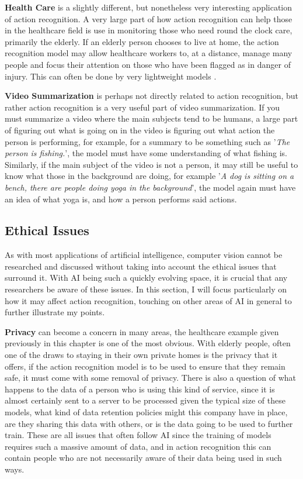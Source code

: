 \textbf{Health Care} is a slightly different, but nonetheless very interesting application of action recognition. A very large part of how action recognition can help those in the healthcare field is use in monitoring those who need round the clock care, primarily the elderly. If an elderly person chooses to live at home, the action recognition model may allow healthcare workers to, at a distance, manage many people and focus their attention on those who have been flagged as in danger of injury. This can often be done by very lightweight models \cite{Eldermonitoring}.

\textbf{Video Summarization} is perhaps not directly related to action recognition, but rather action recognition is a very useful part of video summarization. If you must summarize a video where the main subjects tend to be humans, a large part of figuring out what is going on in the video is figuring out what action the person is performing, for example, for a summary to be something such as '\textit{The person is fishing.}', the model must have some understanding of what fishing is. Similarly, if the main subject of the video is not a person, it may still be useful to know what those in the background are doing, for example '\textit{A dog is sitting on a bench, there are people doing yoga in the background}', the model again must have an idea of what yoga is, and how a person performs said actions.

\subsection{Ethical Issues}

As with most applications of artificial intelligence, computer vision cannot be researched and discussed without taking into account the ethical issues that surround it. With AI being such a quickly evolving space, it is crucial that any researchers be aware of these issues. In this section, I will focus particularly on how it may affect action recognition, touching on other areas of AI in general to further illustrate my points.

\textbf{Privacy} can become a concern in many areas, the healthcare example given previously in this chapter is one of the most obvious. With elderly people, often one of the draws to staying in their own private homes is the privacy that it offers, if the action recognition model is to be used to ensure that they remain safe, it must come with some removal of privacy. There is also a question of what happens to the data of a person who is using this kind of service, since it is almost certainly sent to a server to be processed given the typical size of these models, what kind of data retention policies might this company have in place, are they sharing this data with others, or is the data going to be used to further train. These are all issues that often follow AI since the training of models requires such a massive amount of data, and in action recognition this can contain people who are not necessarily aware of their data being used in such ways.

